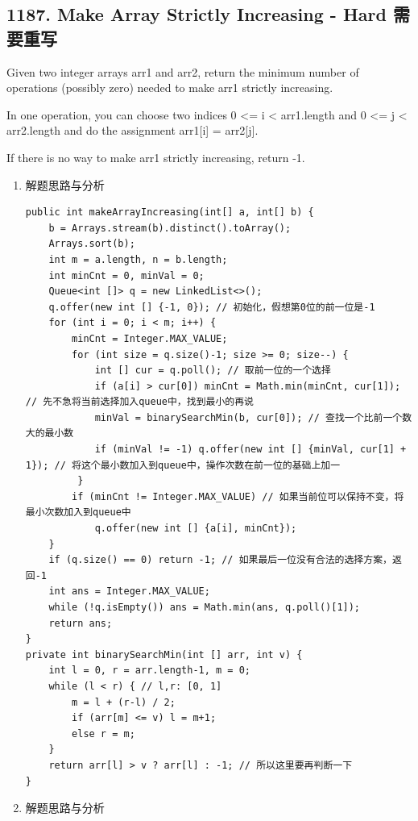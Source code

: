 \documentclass[9pt, b5paaper]{book}
\begin{document}
\subsection{1187. Make Array Strictly Increasing - Hard 需要重写}
\label{sec-1-4-65}
Given two integer arrays arr1 and arr2, return the minimum number of operations (possibly zero) needed to make arr1 strictly increasing.

In one operation, you can choose two indices 0 <= i < arr1.length and 0 <= j < arr2.length and do the assignment arr1[i] = arr2[j].

If there is no way to make arr1 strictly increasing, return -1.
\begin{enumerate}
\item 解题思路与分析
\label{sec-1-4-65-1}
\begin{verbatim}
public int makeArrayIncreasing(int[] a, int[] b) {
    b = Arrays.stream(b).distinct().toArray();
    Arrays.sort(b);
    int m = a.length, n = b.length;
    int minCnt = 0, minVal = 0;
    Queue<int []> q = new LinkedList<>();
    q.offer(new int [] {-1, 0}); // 初始化，假想第0位的前一位是-1
    for (int i = 0; i < m; i++) {
        minCnt = Integer.MAX_VALUE;
        for (int size = q.size()-1; size >= 0; size--) {
            int [] cur = q.poll(); // 取前一位的一个选择
            if (a[i] > cur[0]) minCnt = Math.min(minCnt, cur[1]); // 先不急将当前选择加入queue中，找到最小的再说
            minVal = binarySearchMin(b, cur[0]); // 查找一个比前一个数大的最小数
            if (minVal != -1) q.offer(new int [] {minVal, cur[1] + 1}); // 将这个最小数加入到queue中，操作次数在前一位的基础上加一
         }
        if (minCnt != Integer.MAX_VALUE) // 如果当前位可以保持不变，将最小次数加入到queue中
            q.offer(new int [] {a[i], minCnt}); 
    }
    if (q.size() == 0) return -1; // 如果最后一位没有合法的选择方案，返回-1
    int ans = Integer.MAX_VALUE;
    while (!q.isEmpty()) ans = Math.min(ans, q.poll()[1]);
    return ans;
}
private int binarySearchMin(int [] arr, int v) {
    int l = 0, r = arr.length-1, m = 0;
    while (l < r) { // l,r: [0, 1]
        m = l + (r-l) / 2;
        if (arr[m] <= v) l = m+1;
        else r = m;
    }
    return arr[l] > v ? arr[l] : -1; // 所以这里要再判断一下
}
\end{verbatim}
\item 解题思路与分析
\label{sec-1-4-65-2}


\end{enumerate}
\end{document}
